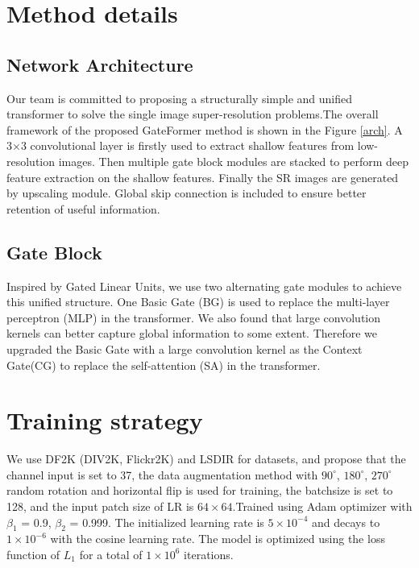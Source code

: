 \documentclass[10pt,twocolumn,letterpaper]{article}
\begin{document}
\section{Method details}
\subsection{Network Architecture}
Our team is committed to proposing a structurally simple and unified transformer to solve the single image super-resolution problems.The overall framework of the proposed GateFormer method is shown in the Figure \ref{arch}. A 3×3 convolutional layer is firstly used to extract shallow features from low-resolution images. Then multiple gate block modules are stacked to perform deep feature extraction on the shallow features. Finally the SR images are generated by upscaling module. Global skip connection is included to ensure better retention of useful information.


\subsection{Gate Block}
Inspired by Gated Linear Units\cite{chen2022simple}, we use two alternating gate modules to achieve this unified structure. One Basic Gate (BG) is used to replace the multi-layer perceptron (MLP)\cite{touvron2022resmlp} in the transformer. We also found that large convolution kernels can better capture global information to some extent. Therefore we upgraded the Basic Gate with a large convolution kernel as the Context Gate(CG) to replace the self-attention (SA)\cite{child2019generating,kitaev2020reformer} in the transformer.





\section{Training strategy}
We use DF2K (DIV2K\cite{agustsson2017ntire}, Flickr2K\cite{lim2017enhanced}) and LSDIR for datasets, and propose that the channel input is set to 37, the data augmentation method with $90^\circ$, $180^\circ$, $270^\circ$ random rotation and horizontal flip is used for training, the batchsize is set to 128, and the input patch size of LR is $64\times64$.Trained using Adam optimizer\cite{kingma2014adam} with $\beta_1$ = 0.9, $\beta_2$ = 0.999. The initialized learning rate is $5\times10^{-4}$ and decays to $1\times10^{-6}$ with the cosine learning rate. The model is optimized using the loss function of $L_1$ for a total of $1\times10^6$ iterations. 
\end{document}
